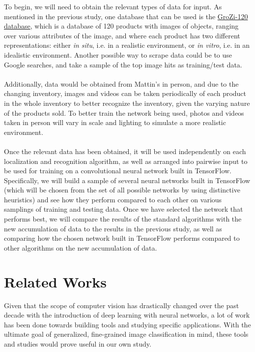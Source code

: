 \documentclass{article}
\begin{document}
To begin, we will need to obtain the relevant types of data for input. As mentioned in the previous study, one database that can be used is the \href{http://grozi.calit2.net/grozi.html}{GroZi-120 database}, which is a database of 120 products with images of objects, ranging over various attributes of the image, and where each product has two different representations: either \textit{in situ}, i.e. in a realistic environment, or \textit{in vitro}, i.e. in an idealistic environment. Another possible way to scrape data could be to use Google searches, and take a sample of the top image hits as training/test data.
\\ \\
Additionally, data would be obtained from Mattin's in person, and due to the changing inventory, images and videos can be taken periodically of each product in the whole inventory to better recognize the inventory, given the varying nature of the products sold. To better train the network being used, photos and videos taken in person will vary in scale and lighting to simulate a more realistic environment.
\\ \\
Once the relevant data has been obtained, it will be used independently on each localization and recognition algorithm, as well as arranged into pairwise input to be used for training on a convolutional neural network built in TensorFlow. Specifically, we will build a sample of several neural networks built in TensorFlow (which will be chosen from the set of all possible networks by using distinctive heuristics) and see how they perform compared to each other on various samplings of training and testing data. Once we have selected the network that performs best, we will compare the results of the standard algorithms with the new accumulation of data to the results in the previous study, as well as comparing how the chosen network built in TensorFlow performs compared to other algorithms on the new accumulation of data.

\section{Related Works}

Given that the scope of computer vision has drastically changed over the past decade with the introduction of deep learning with neural networks, a lot of work has been done towards building tools and studying specific applications. With the ultimate goal of generalized, fine-grained image classification in mind, these tools and studies would prove useful in our own study.
\end{document}
